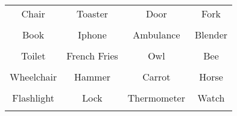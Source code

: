 \documentclass[12pt,a4paper]{article}
\begin{document}
\thispagestyle{empty}
\begin{table}[]
\centering
\Huge
\begin{tabular}{cccc}
 Chair& Toaster& Door& Fork\\  & & & \\
 Book& Iphone& Ambulance& Blender\\  & & & \\
 Toilet& French Fries& Owl& Bee\\  & & & \\
 Wheelchair& Hammer& Carrot& Horse\\  & & & \\
 Flashlight& Lock& Thermometer& Watch\\  & & & \\
\end{tabular}
\end{table}
\end{document}
